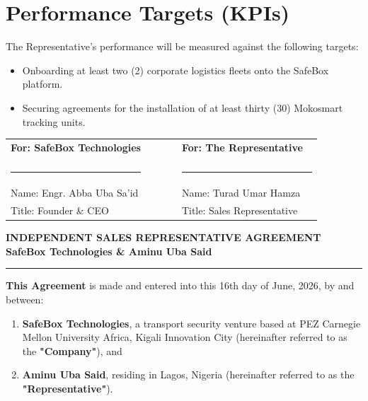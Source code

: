 \documentclass[11pt,a4paper]{article}
\begin{document}
\section{Performance Targets (KPIs)}
The Representative's performance will be measured against the following targets:
\begin{itemize}
    \item Onboarding at least two (2) corporate logistics fleets onto the SafeBox platform.
    \item Securing agreements for the installation of at least thirty (30) Mokosmart tracking units.
\end{itemize}

\vspace{1.0cm}

\noindent\begin{tabular}{p{0.45\linewidth} p{0.1\linewidth} p{0.45\linewidth}}
    \textbf{For: SafeBox Technologies} & & \textbf{For: The Representative} \\
    & & \\
    \rule{0.9\linewidth}{0.5pt} & & \rule{0.9\linewidth}{0.5pt} \\
    Name: Engr. Abba Uba Sa'id & & Name: Turad Umar Hamza \\
    Title: Founder \& CEO & & Title: Sales Representative \\
\end{tabular}

\newpage

\begin{center}
    \large\textbf{INDEPENDENT SALES REPRESENTATIVE AGREEMENT} \\
    \vspace{0.2cm}
    \textbf{SafeBox Technologies \& Aminu Uba Said} \\
    \rule{\linewidth}{0.5pt}
\end{center}

\vspace{0.3cm}

\noindent \textbf{This Agreement} is made and entered into this 16th day of June, 2026, by and between:
\begin{enumerate}
    \item \textbf{SafeBox Technologies}, a transport security venture based at PEZ Carnegie Mellon University Africa, Kigali Innovation City (hereinafter referred to as the \textbf{"Company"}), and
    \item \textbf{Aminu Uba Said}, residing in Lagos, Nigeria (hereinafter referred to as the \textbf{"Representative"}).
\end{enumerate}
\end{document}
